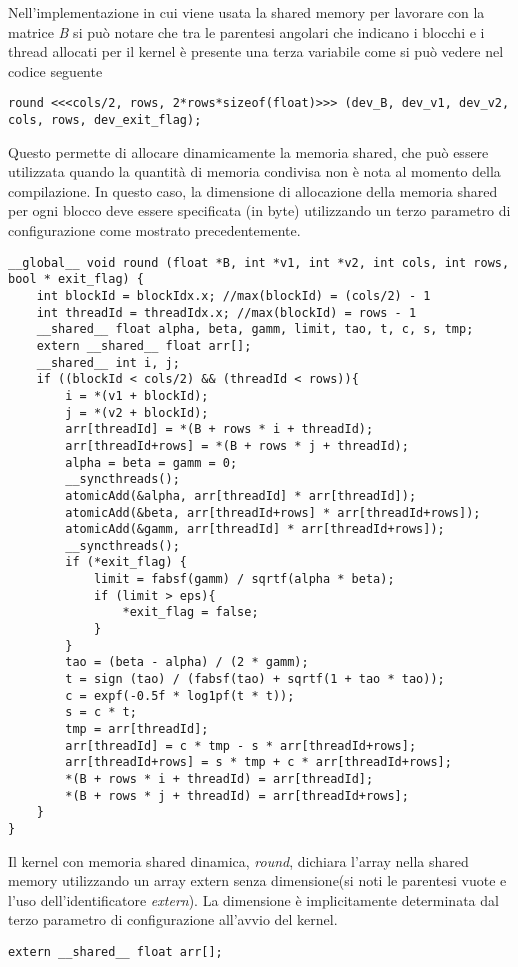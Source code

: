 \label{sec:Shared}
Nell'implementazione in cui viene usata la shared memory per lavorare con la matrice \textit{B} si può notare che tra le parentesi angolari che indicano i blocchi e i thread allocati per il kernel è presente una terza variabile come si può vedere nel codice seguente
\begin{lstlisting}
round <<<cols/2, rows, 2*rows*sizeof(float)>>> (dev_B, dev_v1, dev_v2, cols, rows, dev_exit_flag);
\end{lstlisting}
Questo permette di allocare dinamicamente la memoria shared, che può essere utilizzata quando la quantità di memoria condivisa non è nota al momento della compilazione. In questo caso, la dimensione di allocazione della memoria shared per ogni blocco deve essere specificata (in byte) utilizzando un terzo parametro di configurazione come mostrato precedentemente.
\begin{lstlisting}
__global__ void round (float *B, int *v1, int *v2, int cols, int rows, bool * exit_flag) {
	int blockId = blockIdx.x; //max(blockId) = (cols/2) - 1
	int threadId = threadIdx.x; //max(blockId) = rows - 1
	__shared__ float alpha, beta, gamm, limit, tao, t, c, s, tmp;
	extern __shared__ float arr[];
	__shared__ int i, j;
	if ((blockId < cols/2) && (threadId < rows)){
		i = *(v1 + blockId);
		j = *(v2 + blockId);
		arr[threadId] = *(B + rows * i + threadId);
		arr[threadId+rows] = *(B + rows * j + threadId);
		alpha = beta = gamm = 0;
		__syncthreads();
		atomicAdd(&alpha, arr[threadId] * arr[threadId]);
		atomicAdd(&beta, arr[threadId+rows] * arr[threadId+rows]);	
		atomicAdd(&gamm, arr[threadId] * arr[threadId+rows]);
		__syncthreads();
		if (*exit_flag) {
			limit = fabsf(gamm) / sqrtf(alpha * beta);
			if (limit > eps){
				*exit_flag = false;
			}
		}
		tao = (beta - alpha) / (2 * gamm);
		t = sign (tao) / (fabsf(tao) + sqrtf(1 + tao * tao)); 
		c = expf(-0.5f * log1pf(t * t));
		s = c * t;
		tmp = arr[threadId];
		arr[threadId] = c * tmp - s * arr[threadId+rows];
		arr[threadId+rows] = s * tmp + c * arr[threadId+rows];
		*(B + rows * i + threadId) = arr[threadId];
		*(B + rows * j + threadId) = arr[threadId+rows];
	}
}
\end{lstlisting}
Il kernel con memoria shared dinamica, \textit{round}, dichiara l'array nella shared memory utilizzando un array extern senza dimensione(si noti le parentesi vuote e l'uso dell'identificatore \textit{extern}). La dimensione è implicitamente determinata dal terzo parametro di configurazione all'avvio del kernel.
\begin{lstlisting}
extern __shared__ float arr[];
\end{lstlisting}